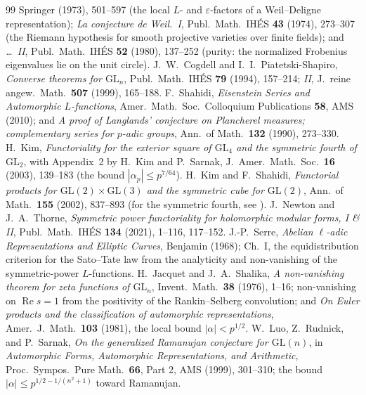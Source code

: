 \documentclass[11pt]{article}
\theoremstyle{definition}
\renewcommand{\Re}{\operatorname{Re}}
\begin{document}
\begin{thebibliography}{99}
Springer (1973), 501--597 (the local $L$- and $\varepsilon$-factors of a Weil--Deligne
representation); \emph{La conjecture de Weil.\ I}, Publ.\ Math.\ IH\'ES \textbf{43} (1974),
273--307 (the Riemann hypothesis for smooth projective varieties over finite fields); and
\emph{\ldots\ II}, Publ.\ Math.\ IH\'ES \textbf{52} (1980), 137--252 (purity: the normalized
Frobenius eigenvalues lie on the unit circle).
 J.~W.~Cogdell and I.~I.~Piatetski-Shapiro, \emph{Converse theorems for
$\mathrm{GL}_n$}, Publ.\ Math.\ IH\'ES \textbf{79} (1994), 157--214; \emph{II}, J.\ reine angew.\
Math.\ \textbf{507} (1999), 165--188.
 F.~Shahidi, \emph{Eisenstein Series and Automorphic $L$-functions}, Amer.\ Math.\
Soc.\ Colloquium Publications \textbf{58}, AMS (2010); and \emph{A proof of Langlands' conjecture on
Plancherel measures; complementary series for $p$-adic groups}, Ann.\ of Math.\ \textbf{132} (1990),
273--330.
\bibitem{KimSarnak} H.~Kim, \emph{Functoriality for the exterior square of $\mathrm{GL}_4$ and the symmetric
fourth of $\mathrm{GL}_2$}, with Appendix~2 by H.~Kim and P.~Sarnak, J.\ Amer.\ Math.\ Soc.\ \textbf{16}
(2003), 139--183 (the bound $|\alpha_p|\le p^{7/64}$).
\bibitem{KimShahidi} H.~Kim and F.~Shahidi, \emph{Functorial products for
$\mathrm{GL}(2)\times\mathrm{GL}(3)$ and the symmetric cube for $\mathrm{GL}(2)$}, Ann.\ of Math.\
\textbf{155} (2002), 837--893 (for the symmetric fourth, see \cite{KimSarnak}).
\bibitem{NT} J.~Newton and J.~A.~Thorne, \emph{Symmetric power functoriality for holomorphic modular
forms, I \& II}, Publ.\ Math.\ IH\'ES \textbf{134} (2021), 1--116, 117--152.
\bibitem{Serre} J.-P.~Serre, \emph{Abelian $\ell$-adic Representations and Elliptic Curves}, Benjamin
(1968); Ch.~I, the equidistribution criterion for the Sato--Tate law from the analyticity and
non-vanishing of the symmetric-power $L$-functions.
\bibitem{JS} H.~Jacquet and J.~A.~Shalika, \emph{A non-vanishing theorem for zeta functions of
$\mathrm{GL}_n$}, Invent.\ Math.\ \textbf{38} (1976), 1--16; non-vanishing on $\Re s=1$ from the
positivity of the Rankin--Selberg convolution; and \emph{On Euler products and the classification of
automorphic representations}, Amer.\ J.\ Math.\ \textbf{103} (1981), the local bound $|\alpha|<p^{1/2}$.
\bibitem{LRS} W.~Luo, Z.~Rudnick, and P.~Sarnak, \emph{On the generalized Ramanujan conjecture for
$\mathrm{GL}(n)$}, in \emph{Automorphic Forms, Automorphic Representations, and Arithmetic}, Proc.\
Sympos.\ Pure Math.\ \textbf{66}, Part 2, AMS (1999), 301--310; the bound
$|\alpha|\le p^{1/2-1/(n^2+1)}$ toward Ramanujan.

\end{thebibliography}
\end{document}
